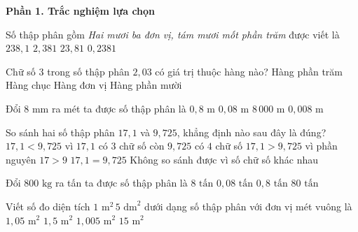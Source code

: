 \textbf{Phần 1. Trắc nghiệm lựa chọn}

\begin{ex} %
Số thập phân gồm \textit{Hai mươi ba đơn vị, tám mươi mốt phần trăm} được viết là
\choice
{$238{,}1$}
{$2{,}381$}
{\True $23{,}81$}
{$0{,}2381$}
\end{ex}

\begin{ex} %
Chữ số $3$ trong số thập phân $2{,}03$ có giá trị thuộc hàng nào?
\choice
{\True Hàng phần trăm}
{Hàng chục}
{Hàng đơn vị}
{Hàng phần mười}
\end{ex}

\begin{ex} %
Đổi $8\text{ mm}$ ra mét ta được số thập phân là
\choice
{$0{,}8\text{ m}$}
{$0{,}08\text{ m}$}
{$8\,000\text{ m}$}
{\True $0{,}008\text{ m}$}
\end{ex}

\begin{ex} %
So sánh hai số thập phân $17{,}1$ và $9{,}725$, khẳng định nào sau đây là đúng?
\choice
{$17{,}1 < 9{,}725$ vì $17{,}1$ có $3$ chữ số còn $9{,}725$ có $4$ chữ số}
{\True $17{,}1 > 9{,}725$ vì phần nguyên $17 > 9$}
{$17{,}1 = 9{,}725$}
{Không so sánh được vì số chữ số khác nhau}
\end{ex}

\begin{ex} %
Đổi $800\text{ kg}$ ra tấn ta được số thập phân là
\choice
{$8\text{ tấn}$}
{$0{,}08\text{ tấn}$}
{\True $0{,}8\text{ tấn}$}
{$80\text{ tấn}$}
\end{ex}

\begin{ex} %
Viết số đo diện tích $1\text{ m}^2\,5\text{ dm}^2$ dưới dạng số thập phân với đơn vị mét vuông là
\choice
{\True $1{,}05\text{ m}^2$}
{$1{,}5\text{ m}^2$}
{$1{,}005\text{ m}^2$}
{$15\text{ m}^2$}
\end{ex}

